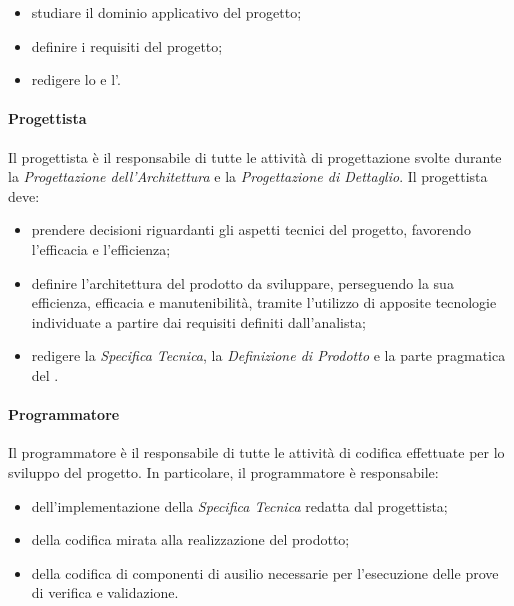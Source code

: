 			\begin{itemize}
				\item studiare il dominio applicativo del progetto;
				\item definire i requisiti del progetto;
				\item redigere lo  e l'.
			\end{itemize}
		
		\paragraph{Progettista}
		
			Il progettista è il responsabile di tutte le attività di progettazione svolte durante la \textit{Progettazione dell'Architettura} e la \textit{Progettazione di Dettaglio}.
			\newline
			Il progettista deve:
			
			\begin{itemize}
				\item prendere decisioni riguardanti gli aspetti tecnici del progetto, favorendo l'efficacia e l'efficienza;
				\item definire l'architettura del prodotto da sviluppare, perseguendo la sua efficienza, efficacia e manutenibilità, tramite l'utilizzo di apposite tecnologie individuate a partire dai requisiti definiti dall'analista;
				\item redigere la \textit{Specifica Tecnica}, la \textit{Definizione di Prodotto} e la parte pragmatica del .
			\end{itemize}
		
		\paragraph{Programmatore}
		
			Il programmatore è il responsabile di tutte le attività di codifica effettuate per lo sviluppo del progetto.
			\newline
			In particolare, il programmatore è responsabile:
			
			\begin{itemize}
				\item dell'implementazione della \textit{Specifica Tecnica} redatta dal progettista;
				\item della codifica mirata alla realizzazione del prodotto;
				\item della codifica di componenti di ausilio necessarie per l'esecuzione delle prove di verifica e validazione.
			\end{itemize}
		
